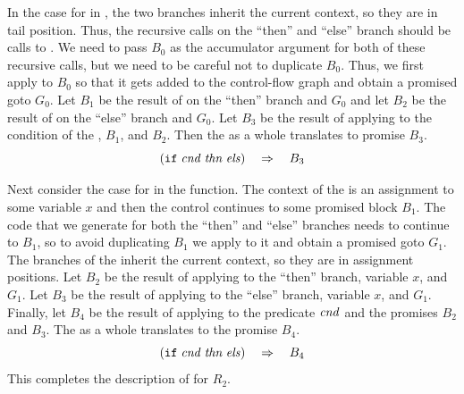 \documentclass[11pt]{book}
\begin{document}
In the case for  in , the two branches
inherit the current context, so they are in tail position. Thus, the
recursive calls on the ``then'' and ``else'' branch should be calls to
.
%
We need to pass $B_0$ as the accumulator argument for both of these
recursive calls, but we need to be careful not to duplicate $B_0$.
Thus, we first apply  to $B_0$ so that it gets added
to the control-flow graph and obtain a promised goto $G_0$.
%
Let $B_1$ be the result of  on the ``then''
branch and $G_0$ and let $B_2$ be the result of 
on the ``else'' branch and $G_0$.  Let $B_3$ be the result of applying
 to the condition of the , $B_1$, and
$B_2$.  Then the  as a whole translates to promise $B_3$.
\[
    (\texttt{if}\; \mathit{cnd}\; \mathit{thn}\; \mathit{els}) \quad\Rightarrow\quad B_3
\]

Next consider the case for  in the 
function. The context of the  is an assignment to some
variable $x$ and then the control continues to some promised block
$B_1$.  The code that we generate for both the ``then'' and ``else''
branches needs to continue to $B_1$, so to avoid duplicating $B_1$ we
apply  to it and obtain a promised goto $G_1$.  The
branches of the  inherit the current context, so they are in
assignment positions.  Let $B_2$ be the result of applying
 to the ``then'' branch, variable $x$, and
$G_1$.  Let $B_3$ be the result of applying  to
the ``else'' branch, variable $x$, and $G_1$. Finally, let $B_4$ be
the result of applying  to the predicate
$\mathit{cnd}$ and the promises $B_2$ and $B_3$. The  as a whole
translates to the promise $B_4$.
\[
(\texttt{if}\; \mathit{cnd}\; \mathit{thn}\; \mathit{els}) \quad\Rightarrow\quad B_4
\]
This completes the description of  for $R_2$.
\end{document}
